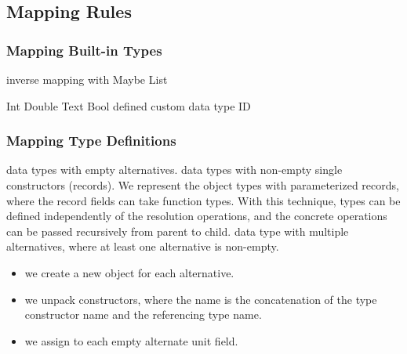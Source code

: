 
\subsection{Mapping Rules}

\begin{frame}\frametitle{Mapping Built-in Types}
\begin{itemize}
  \begin{itemize}
     inverse mapping with Maybe
     List
  \end{itemize}
  \begin{itemize}
     Int
     Double
     Text
     Bool
      defined custom data type ID 
  \end{itemize}
\end{itemize}
\end{frame}

\begin{frame}\frametitle{Mapping Type Definitions}

\begin{itemize}
   data types with empty alternatives.
   data types with non-empty single constructors (records). 
   We represent the object types with parameterized records, where the record fields can take function types. With this technique, types can be defined independently of the resolution operations, and the concrete operations can be passed recursively from parent to child. 
   data type with multiple alternatives, where at least one alternative is non-empty.
  \begin{itemize}
    \item we create a new object for each alternative.
    \item we unpack constructors, where the name is the concatenation of the type constructor name and the referencing type name. 
    \item we assign to each empty alternate unit field.
  \end{itemize}
\end{itemize}

\end{frame}

